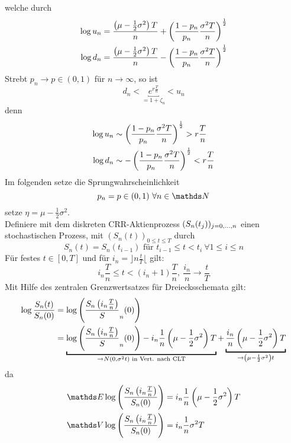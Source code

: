 welche durch
\begin{equation*}
\begin{aligned}
	\log u_n &= \frac{\left( \mu-\frac{1}{2}\sigma^2\right)T}{n}+\left( \frac{1-p_n}{p_n}\frac{\sigma^2T}{n}\right)^{\frac{1}{2}}\\
	\log d_n &= \frac{\left( \mu-\frac{1}{2}\sigma^2\right)T}{n}-\left( \frac{1-p_n}{p_n}\frac{\sigma^2T}{n}\right)^{\frac{1}{2}}
\end{aligned}
\end{equation*}
Strebt $p_n\to p\in (0,1)$ für $n\to \infty$, so ist
\[
d_n<\underbracket{e^{r\frac{T}{n}}}_{=1+\zeta_n}< u_n
\]
denn 
\begin{equation*}
\begin{aligned}
	\log u_n &\sim \left( \frac{1-p_n}{p_n}\frac{\sigma^2T}{n}\right)^{\frac{1}{2}}>r\frac{T}{n}\\
	\log d_n &\sim -\left( \frac{1-p_n}{p_n}\frac{\sigma^2T}{n}\right)^{\frac{1}{2}}<r\frac{T}{n}
\end{aligned}
\end{equation*}
Im folgenden setze die Sprungwahrscheinlichkeit
\[
p_n=p\in (0,1)~\forall n\in \N
\]
setze $\eta=\mu-\frac{1}{2}\sigma^2$.\\
Definiere mit dem diskreten CRR-Aktienprozess $(S_n(t_j))_{j=0, \dots ,n}$ einen stochastischen Prozess, mit $(S_n(t))_{0\le t\le T}$ durch
\[
S_n(t)=S_n(t_{i-1})\text{ für } t_{i-1}\le t<t_i~\forall 1\le i\le n
\]
Für festes $t\in[0,T]$ und für $i_n=\rfloor n\frac{t}{T}\lfloor$ gilt:
\[
i_n\frac{T}{n}\le t<(i_n+1)\frac{T}{n},~\frac{i_n}{n}\to \frac{t}{T}
\]
Mit Hilfe des zentralen Grenzwertsatzes für Dreiecksschemata gilt:
\begin{equation*}
\begin{aligned}
	\log\frac{S_n(t)}{S_n(0)} &= \log\enbrace{\frac{S_n\enbrace{i_n\frac{T}{n}}}S_n(0)}\\
	&=\underbracket{\log\enbrace{\frac{S_n\enbrace{i_n\frac{T}{n}}}S_n(0)}-i_n\frac{1}{n}\enbrace{\mu-\frac{1}{2}\sigma^2}T}_{\to N(0,\sigma^2t)\text{ in Vert. nach CLT}}+\underbracket{\frac{i_n}{n}\enbrace{\mu-\frac{1}{2}\sigma^2}T}_{\to \enbrace{\mu-\frac{1}{2}\sigma^2}t}
\end{aligned}
\end{equation*}
da
\begin{equation*}
\begin{aligned}
	\E\log\enbrace{\frac{S_n\enbrace{i_n\frac{T}{n}}}{S_n(0)}}&= i_n\frac{1}{n}\enbrace{\mu-\frac{1}{2}\sigma^2}T\\
	\V\log\enbrace{\frac{S_n\enbrace{i_n\frac{T}{n}}}{S_n(0)}}&= i_n\frac{1}{n}\sigma^2T
\end{aligned}
\end{equation*}
